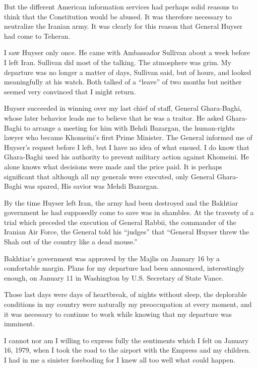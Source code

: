 But the different American information services had perhaps solid reasons to think that the Constitution would be abused. It was therefore necessary to neutralize the Iranian army. It was clearly for this reason that General Huyser had come to Teheran. 

I saw Huyser only once. He came with Ambassador Sullivan about a week before I left Iran. Sullivan did most of the talking. The atmosphere was grim. My departure was no longer a matter of days, Sullivan said, but of hours, and looked meaningfully at his watch. Both talked of a “leave” of two months but neither seemed very convinced that I might return. 

Huyser succeeded in winning over my last chief of staff, General Ghara-Baghi, whose later behavior leads me to believe that he was a traitor. He asked Ghara-Baghi to arrange a meeting for him with Behdi Bazargan, the human-rights lawyer who became Khomeini's first Prime Minister. The General informed me of Huyser’s request before I left, but I have no idea of what ensued. I do know that Ghara-Baghi used his authority to prevent military action against Khomeini. He alone knows what decisions were made and the price paid. It is perhaps significant that although all my generals were executed, only General Ghara-Baghi was spared, His savior was Mehdi Bazargan. 

By the time Huyser left Iran, the army had been destroyed and the Bakhtiar government he had supposedly come to save was in shambles. At the travesty of a trial which preceded the execution of General Rabbii, the commander of the Iranian Air Force, the General told his “judges” that “General Huyser threw the Shah out of the country like a dead mouse.” 

Bakhtiar's government was approved by the Majlis on January 16 by a comfortable margin. Plans for my departure had been announced, interestingly enough, on January 11 in Washington by U.S. Secretary of State Vance. 

Those last days were days of heartbreak, of nights without sleep, the deplorable conditions in my country were naturally my preoccupation at every moment, and it was necessary to continue to work while knowing that my departure was imminent. 

I cannot nor am I willing to express fully the sentiments which I felt on January 16, 1979, when I took the road to the airport with the Empress and my children. I had in me a sinister foreboding for I knew all too well what could happen. 

